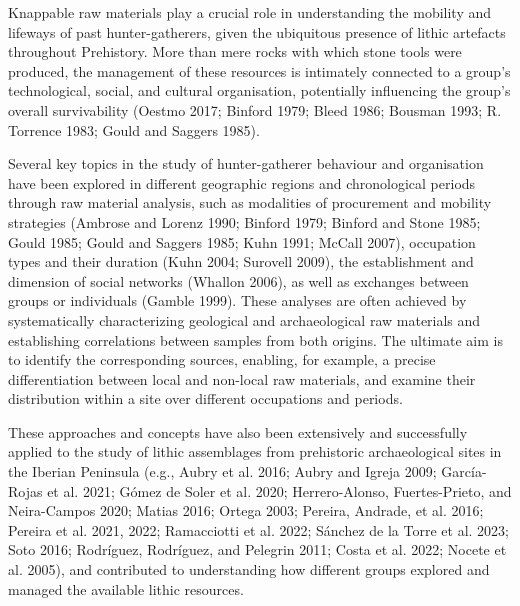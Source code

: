 \documentclass[
  a4paper,
  DIV=11,
  numbers=noendperiod]{scrreprt}
\begin{document}
Knappable raw materials play a crucial role in understanding the
mobility and lifeways of past hunter-gatherers, given the ubiquitous
presence of lithic artefacts throughout Prehistory. More than mere rocks
with which stone tools were produced, the management of these resources
is intimately connected to a group's technological, social, and cultural
organisation, potentially influencing the group's overall survivability
(Oestmo 2017; Binford 1979; Bleed 1986; Bousman 1993; R. Torrence 1983;
Gould and Saggers 1985).

Several key topics in the study of hunter-gatherer behaviour and
organisation have been explored in different geographic regions and
chronological periods through raw material analysis, such as modalities
of procurement and mobility strategies (Ambrose and Lorenz 1990; Binford
1979; Binford and Stone 1985; Gould 1985; Gould and Saggers 1985; Kuhn
1991; McCall 2007), occupation types and their duration (Kuhn 2004;
Surovell 2009), the establishment and dimension of social networks
(Whallon 2006), as well as exchanges between groups or individuals
(Gamble 1999). These analyses are often achieved by systematically
characterizing geological and archaeological raw materials and
establishing correlations between samples from both origins. The
ultimate aim is to identify the corresponding sources, enabling, for
example, a precise differentiation between local and non-local raw
materials, and examine their distribution within a site over different
occupations and periods.

These approaches and concepts have also been extensively and
successfully applied to the study of lithic assemblages from prehistoric
archaeological sites in the Iberian Peninsula (e.g., Aubry et al. 2016;
Aubry and Igreja 2009; García-Rojas et al. 2021; Gómez de Soler et al.
2020; Herrero-Alonso, Fuertes-Prieto, and Neira-Campos 2020; Matias
2016; Ortega 2003; Pereira, Andrade, et al. 2016; Pereira et al. 2021,
2022; Ramacciotti et al. 2022; Sánchez de la Torre et al. 2023; Soto
2016; Rodríguez, Rodríguez, and Pelegrin 2011; Costa et al. 2022; Nocete
et al. 2005), and contributed to understanding how different groups
explored and managed the available lithic resources.
\end{document}
